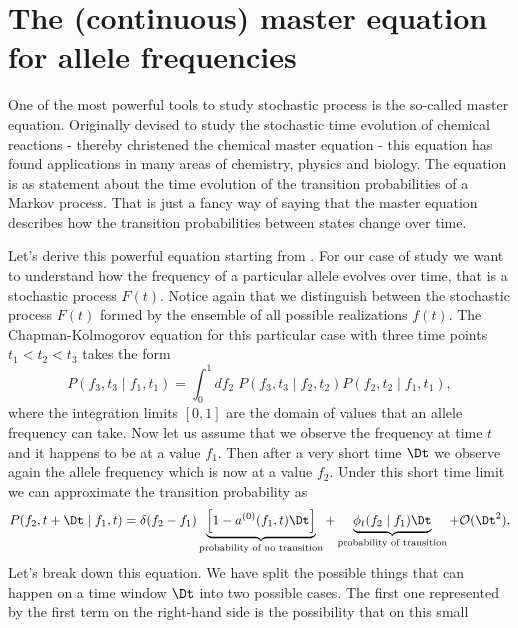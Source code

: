 \section{The (continuous) master equation for allele frequencies}

One of the most powerful tools to study stochastic process is the so-called
master equation. Originally devised to study the stochastic time evolution of
chemical reactions - thereby christened the chemical master equation - this
equation has found applications in many areas of chemistry, physics and biology.
The equation is as statement about the time evolution of the transition
probabilities of a Markov process. That is just a fancy way of saying that the
master equation describes how the transition probabilities between states change
over time.

Let's derive this powerful equation starting from .
For our case of study we want to understand how the frequency of a particular
allele evolves over time, that is a stochastic process $F(t)$. Notice again that
we distinguish between the stochastic process $F(t)$ formed by the ensemble of
all possible realizations $f(t)$. The Chapman-Kolmogorov equation for this
particular case with three time points $t_1 < t_2 < t_3$ takes the form
\begin{equation}
  P(f_3, t_3 \mid f_1, t_1) = \int_0^1 df_2\; P(f_3, t_3 \mid f_2, t_2)
                                          P(f_2, t_2 \mid f_1, t_1),
  \label{eq_chapman_freq}
\end{equation}
where the integration limits $[0, 1]$ are the domain of values that an allele
frequency can take. Now let us assume that we observe the frequency at time $t$
and it happens to be at a value $f_1$. Then after a very short time $\Dt$ we
observe again the allele frequency which is now at a value $f_2$. Under this
short time limit we can approximate the transition probability as
\begin{equation}
  P(f_2, t + \Dt \mid f_1, t) = \delta(f_2 - f_1)
  \underbrace{\left[ 1 - a^{(0)}(f_1, t) \Dt \right]}_{\text{probability
  of no transition}} +
  \underbrace{\phi_t(f_2 \mid f_1)\Dt}_\text{probability of transition} +
  \mathcal{O}(\Dt^2).
  \label{eq_transition_short_time}
\end{equation}
Let's break down this equation. We have split the possible things that can
happen on a time window $\Dt$ into two possible cases. The first one represented
by the first term on the right-hand side is the possibility that on this small

